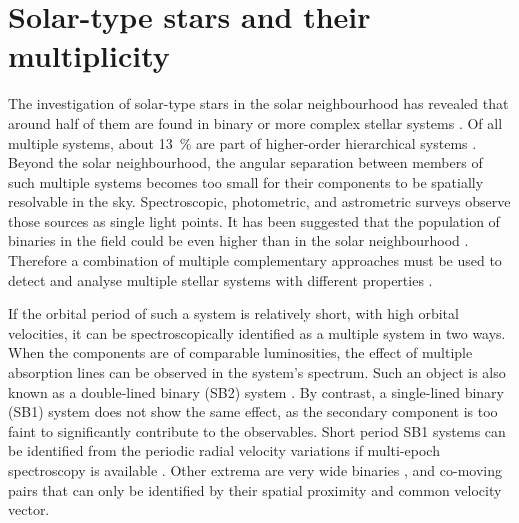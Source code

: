 \section{Solar-type stars and their multiplicity}
\label{sec:multiplicity_intro_twins}
The investigation of solar-type stars in the solar neighbourhood has revealed that around half of them are found in binary or more complex stellar systems \citep{2010ApJS..190....1R, 2013ARA&A..51..269D, 2017ApJS..230...15M}. Of all multiple systems, about 13~\% are part of higher-order hierarchical systems \citep{2010ApJS..190....1R, 2014AJ....147...87T}. Beyond the solar neighbourhood, the angular separation between members of such multiple systems becomes too small for their components to be spatially resolvable in the sky. Spectroscopic, photometric, and astrometric surveys observe those sources as single light points. It has been suggested that the population of binaries in the field could be even higher than in the solar neighbourhood \citep{2000A&A...361..770Q}. Therefore a combination of multiple complementary approaches must be used to detect and analyse multiple stellar systems with different properties \citep{2017ApJS..230...15M}.

If the orbital period of such a system is relatively short, with high orbital velocities, it can be spectroscopically identified as a multiple system in two ways. When the components are of comparable luminosities, the effect of multiple absorption lines can be observed in the system's spectrum. Such an object is also known as a double-lined binary (SB2) system \citep{2004A&A...424..727P, 2010AJ....140..184M, 2017PASP..129h4201F, 2017A&A...608A..95M}. By contrast, a single-lined binary (SB1) system does not show the same effect, as the secondary component is too faint to significantly contribute to the observables. Short period SB1 systems can be identified from the periodic radial velocity variations if multi-epoch spectroscopy is available \citep{1991A&A...248..485D, 2004A&A...418..989N, 2011AJ....141..200M, 2016AJ....151...85T, 2018ApJ...854..147B}. Other extrema are very wide binaries \citep{1988ApJ...335L..47G, 1990AJ....100.1968C, 1995ApJ...441..200G, 2009ApJ...703.1511K, 2011ApJS..192....2S, 2017MNRAS.472..675A, 2018MNRAS.480.4302C}, and co-moving pairs \citep{2017AJ....153..257O, 2019AJ....157...78J} that can only be identified by their spatial proximity and common velocity vector.

